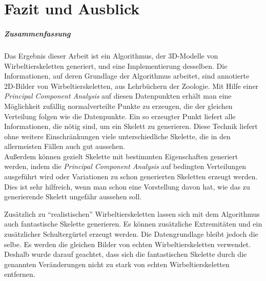 \chapter{Fazit und Ausblick}
\label{chapter:conclusion}

% 
% 

\paragraph{Zusammenfassung}

Das Ergebnis dieser Arbeit ist ein Algorithmus, der 3D-Modelle von Wirbeltierskeletten generiert, und eine Implementierung desselben. Die Informationen, auf deren Grundlage der Algorithmus arbeitet, sind annotierte 2D-Bilder von Wirbeltierskeletten, \zb aus Lehrbüchern der Zoologie. Mit Hilfe einer \emph{Principal Component Analysis} auf diesen Datenpunkten erhält man eine Möglichkeit zufällig normalverteilte Punkte zu erzeugen, die der gleichen Verteilung folgen wie die Datenpunkte.
Ein so erzeugter Punkt liefert alle Informationen, die nötig sind, um ein Skelett zu generieren.
Diese Technik liefert ohne weitere Einschränkungen viele unterschiedliche Skelette, die in den allermeisten Fällen auch gut aussehen.\\
Außerdem können gezielt Skelette mit bestimmten Eigenschaften generiert werden, indem die \emph{Principal Component Analysis} auf bedingten Verteilungen ausgeführt wird oder Variationen zu schon generierten Skeletten erzeugt werden. Dies ist sehr hilfreich, wenn man schon eine Vorstellung davon hat, wie das zu generierende Skelett ungefähr aussehen soll.

Zusätzlich zu "`realistischen"' Wirbeltierskeletten lassen sich mit dem Algorithmus auch fantastische Skelette generieren. Es können zusätzliche Extremitäten und ein zusätzlicher Schultergürtel erzeugt werden.
Die Datengrundlage bleibt jedoch die selbe. Es werden die gleichen Bilder von echten Wirbeltierskeletten verwendet.
Deshalb wurde darauf geachtet, dass sich die fantastischen Skelette durch die genannten Veränderungen nicht zu stark von echten Wirbeltierskeletten entfernen.  

